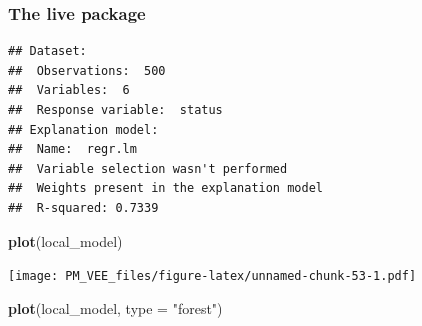 \documentclass[]{krantz}
\newenvironment{Shaded}{\begin{snugshade}}{\end{snugshade}}
\newcommand{\ControlFlowTok}[1]{\textcolor[rgb]{0.13,0.29,0.53}{\textbf{#1}}}
\newcommand{\DataTypeTok}[1]{\textcolor[rgb]{0.13,0.29,0.53}{#1}}
\newcommand{\DecValTok}[1]{\textcolor[rgb]{0.00,0.00,0.81}{#1}}
\newcommand{\KeywordTok}[1]{\textcolor[rgb]{0.13,0.29,0.53}{\textbf{#1}}}
\newcommand{\NormalTok}[1]{#1}
\newcommand{\OperatorTok}[1]{\textcolor[rgb]{0.81,0.36,0.00}{\textbf{#1}}}
\newcommand{\StringTok}[1]{\textcolor[rgb]{0.31,0.60,0.02}{#1}}
\theoremstyle{definition}
\theoremstyle{definition}
\theoremstyle{definition}
\theoremstyle{remark}
\begin{document}
\hypertarget{the-live-package}{%
\subsubsection{\texorpdfstring{\textbf{The live
package}}{The live package}}\label{the-live-package}}

\begin{Shaded}
\end{Shaded}

\begin{verbatim}
## Dataset: 
##  Observations:  500 
##  Variables:  6 
##  Response variable:  status 
## Explanation model: 
##  Name:  regr.lm 
##  Variable selection wasn't performed 
##  Weights present in the explanation model 
##  R-squared: 0.7339
\end{verbatim}

\begin{Shaded}
\begin{Highlighting}[]
\KeywordTok{plot}\NormalTok{(local_model)}
\end{Highlighting}
\end{Shaded}

\texttt{[image: PM\_VEE\_files/figure-latex/unnamed-chunk-53-1.pdf]}

\begin{Shaded}
\begin{Highlighting}[]
\KeywordTok{plot}\NormalTok{(local_model, }\DataTypeTok{type =} \StringTok{"forest"}\NormalTok{)}
\end{Highlighting}
\end{Shaded}
\end{document}
